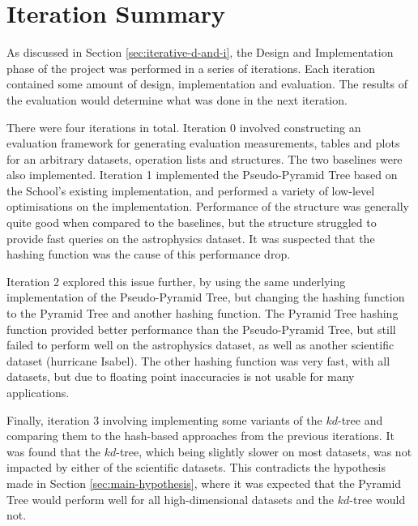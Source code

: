 \section{Iteration Summary}

As discussed in Section \ref{sec:iterative-d-and-i}, the Design and Implementation phase of the project was performed in a series of iterations. Each iteration contained some amount of design, implementation and evaluation. The results of the evaluation would determine what was done in the next iteration.

There were four iterations in total. Iteration 0 involved constructing an evaluation framework for generating evaluation measurements, tables and plots for an arbitrary datasets, operation lists and structures. The two baselines were also implemented. Iteration 1 implemented the Pseudo-Pyramid Tree based on the School's existing implementation, and performed a variety of low-level optimisations on the implementation. Performance of the structure was generally quite good when compared to the baselines, but the structure struggled to provide fast queries on the astrophysics dataset. It was suspected that the hashing function was the cause of this performance drop.

Iteration 2 explored this issue further, by using the same underlying implementation of the Pseudo-Pyramid Tree, but changing the hashing function to the Pyramid Tree and another hashing function. The Pyramid Tree hashing function provided better performance than the Pseudo-Pyramid Tree, but still failed to perform well on the astrophysics dataset, as well as another scientific dataset (hurricane Isabel). The other hashing function was very fast, with all datasets, but due to floating point inaccuracies is not usable for many applications.

Finally, iteration 3 involving implementing some variants of the $kd$-tree and comparing them to the hash-based approaches from the previous iterations. It was found that the $kd$-tree, which being slightly slower on most datasets, was not impacted by either of the scientific datasets. This contradicts the hypothesis made in Section \ref{sec:main-hypothesis}, where it was expected that the Pyramid Tree would perform well for all high-dimensional datasets and the $kd$-tree would not.